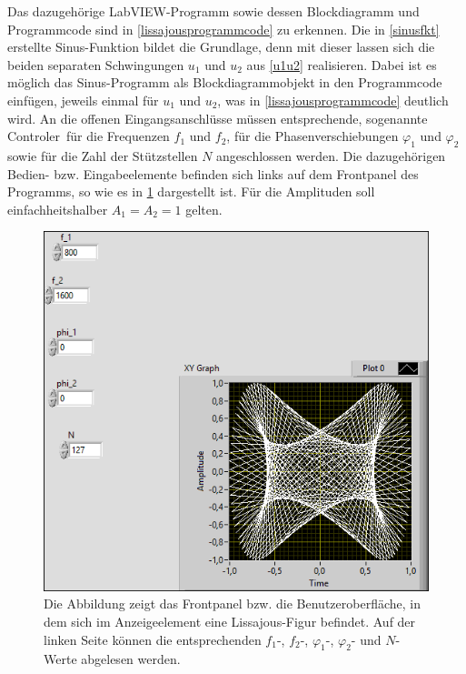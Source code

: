 \documentclass[
a4paper,
12pt,
pagesize,
ngerman
]{scrartcl}
\begin{document}
	\noindent Das dazugehörige LabVIEW-Programm sowie dessen Blockdiagramm und Programmcode sind in \cref{lissajousprogrammcode} zu erkennen. Die in \cref{sinusfkt} erstellte Sinus-Funktion bildet die Grundlage, denn mit dieser lassen sich die beiden separaten Schwingungen $u_1$ und $u_2$ aus \cref{u1u2} realisieren. Dabei ist es möglich das Sinus-Programm als Blockdiagrammobjekt in den Programmcode einfügen, jeweils einmal für $u_1$ und $u_2$, was in \cref{lissajousprogrammcode} deutlich wird. An die offenen Eingangsanschlüsse müssen entsprechende, sogenannte \glqq Controler\grqq\ für die Frequenzen $f_1$ und $f_2$, für die Phasenverschiebungen $\varphi_1$ und $\varphi_2$ sowie für die Zahl der Stützstellen $N$ angeschlossen werden. Die dazugehörigen Bedien- bzw. Eingabeelemente befinden sich links auf dem Frontpanel des Programms, so wie es in \cref{lissajous} dargestellt ist. Für die Amplituden soll einfachheitshalber $A_1 = A_2 = 1$ gelten.

	\begin{figure}[H]
		\centering
		\includegraphics[width=1.0\textwidth]{EIRE2018Dateien/Tag1/lissajous-bilder/Lissajousp}
		\caption{Die Abbildung zeigt das Frontpanel bzw. die Benutzeroberfläche, in dem sich im Anzeigeelement eine Lissajous-Figur befindet. Auf der linken Seite können die entsprechenden $f_1$-, $f_2$-, $\varphi_1$-, $\varphi_2$- und $N$-Werte abgelesen werden.}
		\label{lissajous}
	\end{figure}
\end{document}
